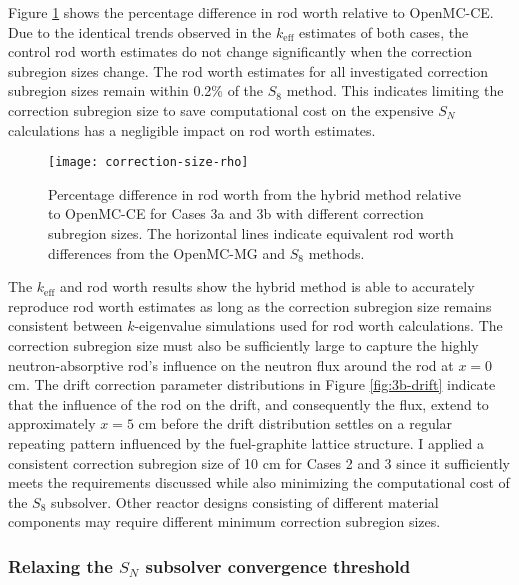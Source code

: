 Figure \ref{fig:v1-size-rho} shows the percentage difference in rod worth relative to OpenMC-CE. 
Due to the identical trends observed in the $k_\text{eff}$ estimates of both cases, the control rod
worth estimates do not change significantly when the correction subregion
sizes change. The rod worth estimates for all investigated correction subregion sizes remain within
0.2\% of the $S_8$ method. This indicates limiting the correction subregion size to save
computational cost on the expensive $S_N$ calculations has a negligible impact on rod worth
estimates.

\begin{figure}[htb!]
  \centering
  \texttt{[image: correction-size-rho]}
  \caption{Percentage difference in rod worth from the hybrid method relative to OpenMC-CE for
    Cases 3a and 3b with different correction subregion sizes. The horizontal lines indicate
    equivalent rod worth differences from the OpenMC-MG and $S_8$ methods.}
  \label{fig:v1-size-rho}
\end{figure}

The $k_\text{eff}$ and rod worth results show the hybrid method is able to accurately
reproduce rod worth estimates as long as the correction subregion size remains consistent between
$k$-eigenvalue simulations used for rod worth calculations. The
correction subregion size must also be sufficiently large to capture the highly neutron-absorptive
rod's influence on the neutron flux around the rod at $x=0$ cm. The drift correction parameter
distributions in Figure \ref{fig:3b-drift} indicate that the influence of the rod on the drift, and
consequently the flux, extend to approximately $x=5$ cm before the drift distribution settles on a
regular repeating pattern influenced by the fuel-graphite lattice structure. I applied a consistent
correction subregion size of 10 cm for Cases 2 and 3 since it sufficiently meets the requirements
discussed while also minimizing the computational cost of the $S_8$ subsolver. Other reactor
designs consisting of different material components may require different minimum correction
subregion sizes.

\subsubsection{Relaxing the $S_N$ subsolver convergence threshold}

